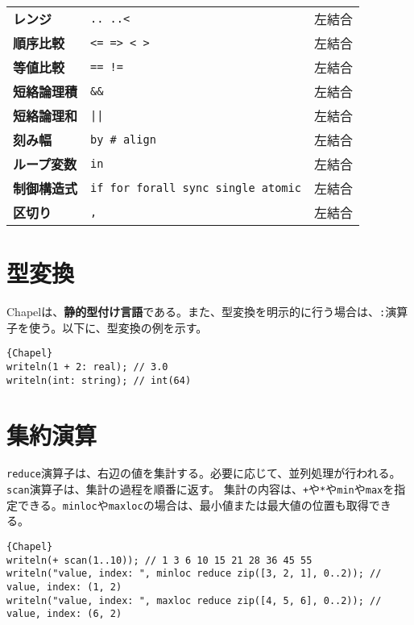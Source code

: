 \documentclass[10pt,a4paper]{book}
\begin{document}
\begin{table}[h]
\begin{tabular}{lll}
\textbf{レンジ}       & \verb#.. ..<#                           & 左結合 \\
\textbf{順序比較}     & \verb#<= => < >#                        & 左結合 \\
\textbf{等値比較}     & \verb#== !=#                            & 左結合 \\
\textbf{短絡論理積}   & \verb#&&#                               & 左結合 \\
\textbf{短絡論理和}   & \verb#||#                               & 左結合 \\
\textbf{刻み幅}       & \verb|by # align|                       & 左結合 \\
\textbf{ループ変数}   & \verb#in#                               & 左結合 \\
\textbf{制御構造式}   & \verb#if for forall sync single atomic# & 左結合 \\
\textbf{区切り}       & \verb#,#                                & 左結合 \\
\end{tabular}
\end{table}

\section{型変換}

Chapelは、\textbf{静的型付け言語}である。また、型変換を明示的に行う場合は、\texttt{:}演算子を使う。以下に、型変換の例を示す。

\begin{Verbatim}{Chapel}
writeln(1 + 2: real); // 3.0
writeln(int: string); // int(64)
\end{Verbatim}

\section{集約演算}

\texttt{reduce}演算子は、右辺の値を集計する。必要に応じて、並列処理が行われる。\texttt{scan}演算子は、集計の過程を順番に返す。
集計の内容は、\texttt{+}や\texttt{*}や\texttt{min}や\texttt{max}を指定できる。\texttt{minloc}や\texttt{maxloc}の場合は、最小値または最大値の位置も取得できる。

\begin{Verbatim}{Chapel}
writeln(+ scan(1..10)); // 1 3 6 10 15 21 28 36 45 55
writeln("value, index: ", minloc reduce zip([3, 2, 1], 0..2)); // value, index: (1, 2)
writeln("value, index: ", maxloc reduce zip([4, 5, 6], 0..2)); // value, index: (6, 2)
\end{Verbatim}
\end{document}
